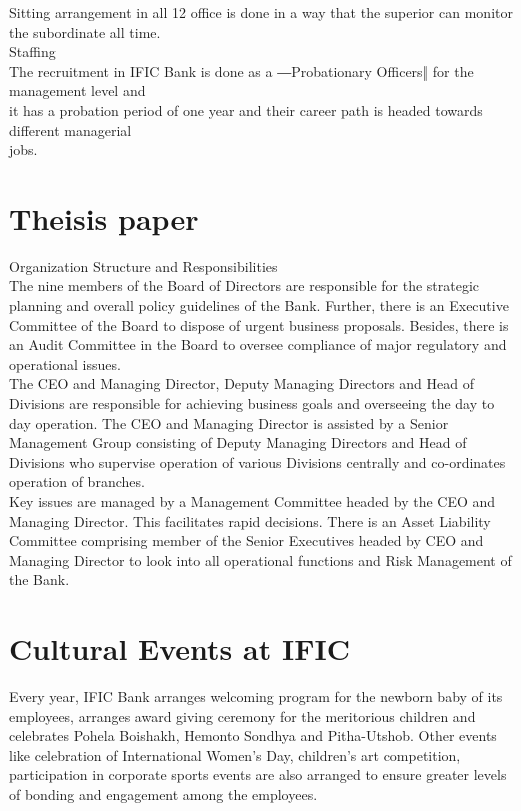 \documentclass[11pt]{article}
\begin{document}
Sitting arrangement in all 12 office is done in a way that the superior can monitor the subordinate all time.\\
Staffing\\
The recruitment in IFIC Bank is done as a ―Probationary Officers‖ for the management level and\\
it has a probation period of one year and their career path is headed towards different managerial\\
jobs.\\
\section{Theisis paper}
\label{sec:orge5da16f}
 Organization Structure and Responsibilities\\
The nine members of the Board of Directors are responsible for the strategic planning and overall policy guidelines of the Bank. Further, there is an Executive Committee of the Board to dispose of urgent business proposals. Besides, there is an Audit Committee in the Board to oversee compliance of major regulatory and operational issues.\\
The CEO and Managing Director, Deputy Managing Directors and Head of Divisions are responsible for achieving business goals and overseeing the day to day operation. The CEO and Managing Director is assisted by a Senior Management Group consisting of Deputy Managing Directors and Head of Divisions who supervise operation of various Divisions centrally and co-ordinates operation of branches.\\
Key issues are managed by a Management Committee headed by the CEO and Managing Director. This facilitates rapid decisions. There is an Asset Liability Committee comprising member of the Senior Executives headed by CEO and Managing Director to look into all operational functions and Risk Management of the Bank.\\
\section{Cultural Events at IFIC}
\label{sec:org04af7cd}
Every year, IFIC Bank arranges welcoming program for the newborn baby of its employees, arranges award giving ceremony for the meritorious children and celebrates Pohela Boishakh, Hemonto Sondhya and Pitha-Utshob. Other events like celebration of International Women’s Day, children’s art competition, participation in corporate sports events are also arranged to ensure greater levels of bonding and engagement among the employees.\\
\end{document}
